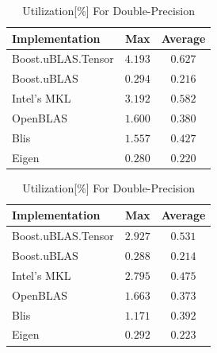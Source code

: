 \begin{table}[ht]
    \centering
    \caption{Utilization[\%] For Single-Precision}
    \begin{tabular}{|l|c|c|}
        \hline
        \textbf{Implementation} & \textbf{Max} & \textbf{Average}\\
        \hline
        Boost.uBLAS.Tensor  & $4.193$ & $0.627$ \\
        \hline
        Boost.uBLAS         & $0.294$ & $0.216$ \\
        \hline
        Intel's MKL         & $3.192$ & $0.582$ \\
        \hline
        OpenBLAS            & $1.600$ & $0.380$ \\
        \hline
        Blis                & $1.557$ & $0.427$ \\
        \hline
        Eigen               & $0.280$ & $0.220$ \\
        \hline
    \end{tabular}

    \vspace*{1 cm}

    \centering
    \caption{Utilization[\%] For Double-Precision}
    \begin{tabular}{|l|c|c|}
        \hline
        \textbf{Implementation} & \textbf{Max} & \textbf{Average}\\
        \hline
        Boost.uBLAS.Tensor  & $2.927$ & $0.531$ \\
        \hline
        Boost.uBLAS         & $0.288$ & $0.214$ \\
        \hline
        Intel's MKL         & $2.795$ & $0.475$ \\
        \hline
        OpenBLAS            & $1.663$ & $0.373$ \\
        \hline
        Blis                & $1.171$ & $0.392$ \\
        \hline
        Eigen               & $0.292$ & $0.223$ \\
        \hline
    \end{tabular}
\end{table}

